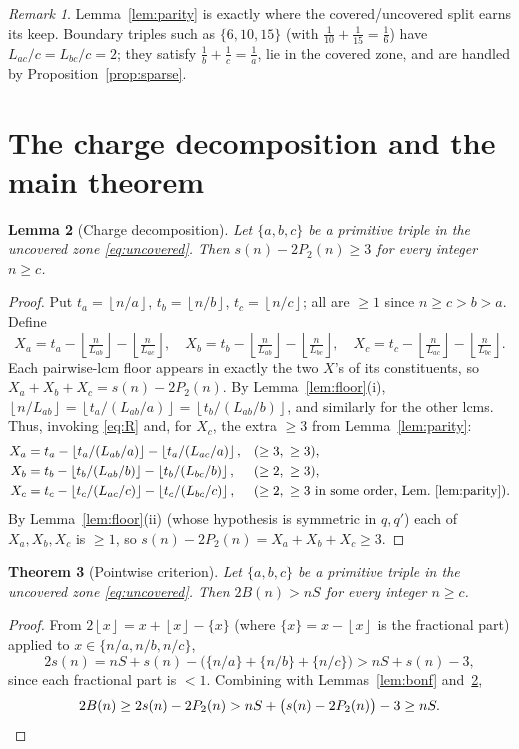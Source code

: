 \documentclass[11pt]{article}
\newtheorem{theorem}{Theorem}
\newtheorem{lemma}[theorem]{Lemma}
\theoremstyle{remark}
\newtheorem{remark}[theorem]{Remark}
\newcommand{\floor}[1]{\left\lfloor #1 \right\rfloor}
\begin{document}
\begin{remark}
Lemma~\ref{lem:parity} is exactly where the covered/uncovered split earns its
keep. Boundary triples such as $\{6,10,15\}$ (with $\tfrac1{10}+\tfrac1{15}
=\tfrac16$) have $L_{ac}/c=L_{bc}/c=2$; they satisfy
$\tfrac1b+\tfrac1c=\tfrac1a$, lie in the covered zone, and are handled by
Proposition~\ref{prop:sparse}.
\end{remark}

\section{The charge decomposition and the main theorem}

\begin{lemma}[Charge decomposition]\label{lem:charge}
Let $\{a,b,c\}$ be a primitive triple in the uncovered zone \eqref{eq:uncovered}.
Then $s(n)-2P_2(n)\ge 3$ for every integer $n\ge c$.
\end{lemma}
\begin{proof}
Put $t_a=\floor{n/a}$, $t_b=\floor{n/b}$, $t_c=\floor{n/c}$; all are $\ge 1$ since
$n\ge c>b>a$. Define
\[
  X_a=t_a-\floor{\tfrac n{L_{ab}}}-\floor{\tfrac n{L_{ac}}},\quad
  X_b=t_b-\floor{\tfrac n{L_{ab}}}-\floor{\tfrac n{L_{bc}}},\quad
  X_c=t_c-\floor{\tfrac n{L_{ac}}}-\floor{\tfrac n{L_{bc}}}.
\]
Each pairwise-lcm floor appears in exactly the two $X$'s of its constituents, so
$X_a+X_b+X_c=s(n)-2P_2(n)$. By Lemma~\ref{lem:floor}(i),
$\floor{n/L_{ab}}=\floor{t_a/(L_{ab}/a)}=\floor{t_b/(L_{ab}/b)}$, and similarly
for the other lcms. Thus, invoking \eqref{eq:R} and, for $X_c$, the extra
$\ge 3$ from Lemma~\ref{lem:parity}:
\[
\begin{aligned}
X_a&=t_a-\floor{t_a/(L_{ab}/a)}-\floor{t_a/(L_{ac}/a)}, &&(\ge 3,\ \ge 3),\\
X_b&=t_b-\floor{t_b/(L_{ab}/b)}-\floor{t_b/(L_{bc}/b)}, &&(\ge 2,\ \ge 3),\\
X_c&=t_c-\floor{t_c/(L_{ac}/c)}-\floor{t_c/(L_{bc}/c)}, &&(\ge 2,\ \ge 3\text{ in some order, Lem.\ \ref{lem:parity}}).
\end{aligned}
\]
By Lemma~\ref{lem:floor}(ii) (whose hypothesis is symmetric in $q,q'$) each of
$X_a,X_b,X_c$ is $\ge 1$, so $s(n)-2P_2(n)=X_a+X_b+X_c\ge 3$.
\end{proof}

\begin{theorem}[Pointwise criterion]\label{thm:crit}
Let $\{a,b,c\}$ be a primitive triple in the uncovered zone \eqref{eq:uncovered}.
Then $2B(n)>nS$ for every integer $n\ge c$.
\end{theorem}
\begin{proof}
From $2\floor x=x+\floor x-\{x\}$ (where $\{x\}=x-\floor x$ is the fractional
part) applied to $x\in\{n/a,n/b,n/c\}$,
\[
  2s(n)=nS+s(n)-\bigl(\{n/a\}+\{n/b\}+\{n/c\}\bigr)>nS+s(n)-3,
\]
since each fractional part is $<1$. Combining with Lemmas~\ref{lem:bonf}
and~\ref{lem:charge},
\[
  2B(n)\ge 2s(n)-2P_2(n)>nS+\bigl(s(n)-2P_2(n)\bigr)-3\ge nS. \qedhere
\]
\end{proof}
\end{document}
